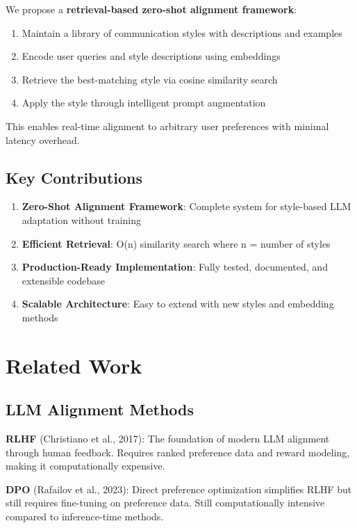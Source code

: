 \documentclass[11pt,a4paper]{article}
\begin{document}
We propose a \textbf{retrieval-based zero-shot alignment framework}:

\begin{enumerate}
    \item Maintain a library of communication styles with descriptions and examples
    \item Encode user queries and style descriptions using embeddings
    \item Retrieve the best-matching style via cosine similarity search
    \item Apply the style through intelligent prompt augmentation
\end{enumerate}

This enables real-time alignment to arbitrary user preferences with minimal latency overhead.

\subsection{Key Contributions}

\begin{enumerate}
    \item \textbf{Zero-Shot Alignment Framework}: Complete system for style-based LLM adaptation without training
    \item \textbf{Efficient Retrieval}: O(n) similarity search where n = number of styles
    \item \textbf{Production-Ready Implementation}: Fully tested, documented, and extensible codebase
    \item \textbf{Scalable Architecture}: Easy to extend with new styles and embedding methods
\end{enumerate}

\section{Related Work}

\subsection{LLM Alignment Methods}

\textbf{RLHF} (Christiano et al., 2017): The foundation of modern LLM alignment through human feedback. Requires ranked preference data and reward modeling, making it computationally expensive.

\textbf{DPO} (Rafailov et al., 2023): Direct preference optimization simplifies RLHF but still requires fine-tuning on preference data. Still computationally intensive compared to inference-time methods.
\end{document}
